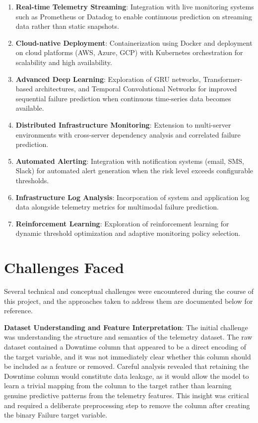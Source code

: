 \documentclass[12pt,letterpaper]{report}
\begin{document}
\begin{enumerate}[label=\arabic*.]
  \item \textbf{Real-time Telemetry Streaming}: Integration with live monitoring systems such as Prometheus or Datadog to enable continuous prediction on streaming data rather than static snapshots.
  \item \textbf{Cloud-native Deployment}: Containerization using Docker and deployment on cloud platforms (AWS, Azure, GCP) with Kubernetes orchestration for scalability and high availability.
  \item \textbf{Advanced Deep Learning}: Exploration of GRU networks, Transformer-based architectures, and Temporal Convolutional Networks for improved sequential failure prediction when continuous time-series data becomes available.
  \item \textbf{Distributed Infrastructure Monitoring}: Extension to multi-server environments with cross-server dependency analysis and correlated failure prediction.
  \item \textbf{Automated Alerting}: Integration with notification systems (email, SMS, Slack) for automated alert generation when the risk level exceeds configurable thresholds.
  \item \textbf{Infrastructure Log Analysis}: Incorporation of system and application log data alongside telemetry metrics for multimodal failure prediction.
  \item \textbf{Reinforcement Learning}: Exploration of reinforcement learning for dynamic threshold optimization and adaptive monitoring policy selection.
\end{enumerate}

\section{Challenges Faced}

Several technical and conceptual challenges were encountered during the course of this project, and the approaches taken to address them are documented below for reference.

\textbf{Dataset Understanding and Feature Interpretation}: The initial challenge was understanding the structure and semantics of the telemetry dataset. The raw dataset contained a Downtime column that appeared to be a direct encoding of the target variable, and it was not immediately clear whether this column should be included as a feature or removed. Careful analysis revealed that retaining the Downtime column would constitute data leakage, as it would allow the model to learn a trivial mapping from the column to the target rather than learning genuine predictive patterns from the telemetry features. This insight was critical and required a deliberate preprocessing step to remove the column after creating the binary Failure target variable.
\end{document}
